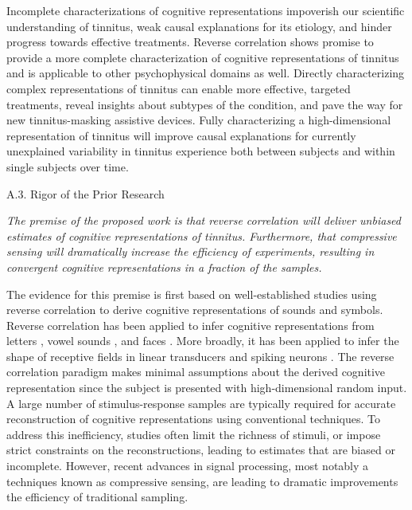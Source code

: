 \documentclass[11pt, notitlepage]{article} %
\begin{document}
Incomplete characterizations of cognitive representations impoverish our scientific understanding of tinnitus,
weak causal explanations for its etiology, and hinder progress towards effective treatments.
Reverse correlation shows promise to provide a more complete characterization of cognitive representations of tinnitus
and is applicable to other psychophysical domains as well.
Directly characterizing complex representations of tinnitus can enable more effective, targeted treatments,
reveal insights about subtypes of the condition, and pave the way for new tinnitus-masking assistive devices.
Fully characterizing a high-dimensional representation of tinnitus will improve causal explanations
for currently unexplained variability in tinnitus experience both between subjects and within single subjects over time.

\begin{description}
	\item[A.3. Rigor of the Prior Research]{}
\end{description}

\emph{The premise of the proposed work is that reverse correlation will deliver unbiased estimates
of cognitive representations of tinnitus. Furthermore, that compressive sensing will dramatically
increase the efficiency of experiments, resulting in convergent cognitive representations
in a fraction of the samples.}

The evidence for this premise is first based on well-established studies using reverse correlation
to derive cognitive representations of sounds and symbols.
Reverse correlation has been applied to infer cognitive representations from letters
\cite{gosselinSuperstitiousPerceptionsReveal2003}, vowel sounds \cite{brimijoinInternalRepresentationVowel2013},
and faces \cite{brinkmanVisualisingMentalRepresentations2017,smithMeasuringInternalRepresentations2012}.
More broadly, it has been applied to infer the shape of receptive fields
in linear transducers and spiking neurons \cite{ringachReverseCorrelationNeurophysiology2004}.
The reverse correlation paradigm makes minimal assumptions about the derived cognitive representation
since the subject is presented with high-dimensional random input.
A large number of stimulus-response samples are typically required for accurate
reconstruction of cognitive representations using conventional techniques. To address this inefficiency,
studies often limit the richness of stimuli, or impose strict constraints on the reconstructions, leading to
estimates that are biased or incomplete. However, recent advances in signal processing, most notably
a techniques known as compressive sensing, are leading to dramatic improvements the efficiency of
traditional sampling.
\end{document}
